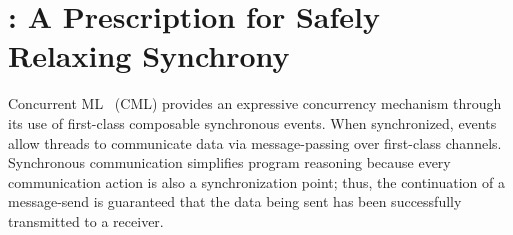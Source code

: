\newcommand{\OExec}[3]{\langle #1, #2 \rangle_{#3}}
\newcommand{\ExecP}{\langle {\sf P}, \ActionSet,\po,\co \rangle}
\newcommand{\PrgState}[2]{\langle (t,E[#1]) \;\|\; \threadsoup,#2 \rangle}

\newcommand{\trace}{\mathit{tr}}
\newcommand{\commit}[2]{\epsilon_{(#1,#2)}}

\newcommand{\wf}[1]{{\sf WF}(#1)}
\newcommand{\transOpAx}[2]{\opax(#1,#2)}

\newcommand{\filtera}[2]{#1{\downarrow}_{#2}}

\newcommand{\thread}{\mathit{T}}
\newcommand{\threadid}{\textsf{t}}
\newcommand{\spawn}{\textsf{spawn}}
\newcommand{\unit}{\textsf{unit}}
\newcommand{\threadsoup}{\overline{\mathit{T}}}
\newcommand{\threadsoupp}{\overline{\mathit{T'}}}
\newcommand{\eval}[1]{\mathit{E}[#1]}
\newcommand{\evaln}{\mathit{E}}
\newcommand{\chan}{\textsf{ch}}
\newcommand{\send}{\textsf{send}}
\newcommand{\recv}{\textsf{recv}}
\newcommand{\join}{\textsf{join}}
\newcommand{\con}{\textsf{Con}}
\newcommand{\prev}{\textsf{Prev}}
\newcommand{\fresh}{\textsf{fresh}}
\newcommand{\print}{\textsf{print}}
\newcommand{\tupletwo}[2]{(#1,#2)}
\newcommand{\ALT}{~\mid~}
\newcommand{\ruleref}[1]{{\sc\small [#1]}}
\renewcommand{\bar}{\overline}

\newcommand{\opIntraState}[1]{E[#1]}
\newcommand{\readyOp}[1]{\R{\SCFN{Ready}}_{op}(#1)}
\newcommand{\doneOp}{\R{\SCFN{Done}}_{op}}
\newcommand{\localstate}{L}
\newcommand{\ProgramState}{\R{\SCFN{ProgState}}}
\newcommand{\opax}{{\cal T}^{\mbox{\tiny\sc op}}_{\mbox{\tiny\sc ax}}}
\newcommand{\opaxGen}{{\cal G}^{\mbox{\tiny\sc op}}_{\mbox{\tiny\sc ax}}}
\newcommand{\axcml}{\R{\SCFN{Ax$_2$Cml}}}




\chapter{\rxcml: A Prescription for Safely Relaxing Synchrony}
\label{chap:rxcml}

Concurrent ML~\cite{Reppy07} (CML) provides an expressive concurrency mechanism
through its use of first-class composable synchronous events.  When
synchronized, events allow threads to communicate data via message-passing over
first-class channels.  Synchronous communication simplifies program reasoning
because every communication action is also a synchronization point; thus, the
continuation of a message-send is guaranteed that the data being sent has been
successfully transmitted to a receiver.

